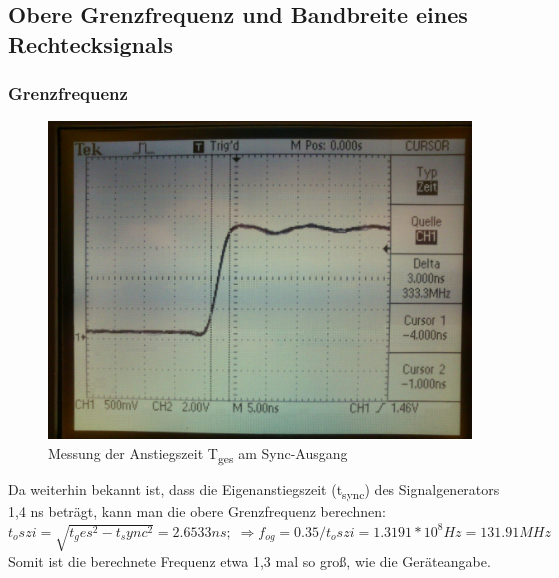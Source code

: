 \subsection{Obere Grenzfrequenz und Bandbreite eines Rechtecksignals}
\subsubsection*{Grenzfrequenz}
\begin{figure}[H]
	\centering
	\includegraphics[width=\linewidth]{versuch3/oszi/DSC_0313.JPG}
	\caption{Messung der Anstiegszeit T\textsubscript{ges} am Sync-Ausgang}
\end{figure}
Da weiterhin bekannt ist, dass die Eigenanstiegszeit (t\textsubscript{sync}) des Signalgenerators 1,4 ns beträgt, kann man die obere Grenzfrequenz berechnen:\\
$ t_oszi = \sqrt{t_ges^2 - t_sync^2} = 2.6533 ns; \; \Rightarrow f_{og} = 0.35/t_oszi = 1.3191*10^8 Hz = 131.91 MHz $
Somit ist die berechnete Frequenz etwa 1,3 mal so groß, wie die Geräteangabe.
